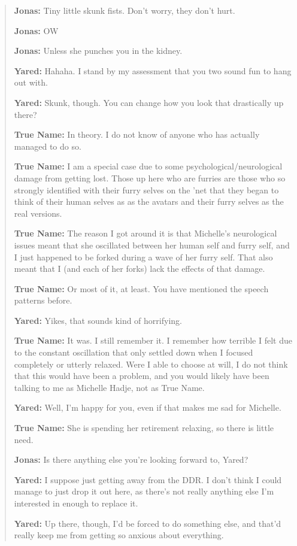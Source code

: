 \begin{quote}
\textbf{Jonas:} Tiny little skunk fists. Don't worry, they don't hurt.

\textbf{Jonas:} OW

\textbf{Jonas:} Unless she punches you in the kidney.

\textbf{Yared:} Hahaha. I stand by my assessment that you two sound fun to hang out with.

\textbf{Yared:} Skunk, though. You can change how you look that drastically up there?

\textbf{True Name:} In theory. I do not know of anyone who has actually managed to do so.

\textbf{True Name:} I am a special case due to some psychological/neurological damage from getting lost. Those up here who are furries are those who so strongly identified with their furry selves on the 'net that they began to think of their human selves as as the avatars and their furry selves as the real versions.

\textbf{True Name:} The reason I got around it is that Michelle's neurological issues meant that she oscillated between her human self and furry self, and I just happened to be forked during a wave of her furry self. That also meant that I (and each of her forks) lack the effects of that damage.

\textbf{True Name:} Or most of it, at least. You have mentioned the speech patterns before.

\textbf{Yared:} Yikes, that sounds kind of horrifying.

\textbf{True Name:} It was. I still remember it. I remember how terrible I felt due to the constant oscillation that only settled down when I focused completely or utterly relaxed. Were I able to choose at will, I do not think that this would have been a problem, and you would likely have been talking to me as Michelle Hadje, not as True Name.

\textbf{Yared:} Well, I'm happy for you, even if that makes me sad for Michelle.

\textbf{True Name:} She is spending her retirement relaxing, so there is little need.

\textbf{Jonas:} Is there anything else you're looking forward to, Yared?

\textbf{Yared:} I suppose just getting away from the DDR. I don't think I could manage to just drop it out here, as there's not really anything else I'm interested in enough to replace it.

\textbf{Yared:} Up there, though, I'd be forced to do something else, and that'd really keep me from getting so anxious about everything.


\end{quote}
